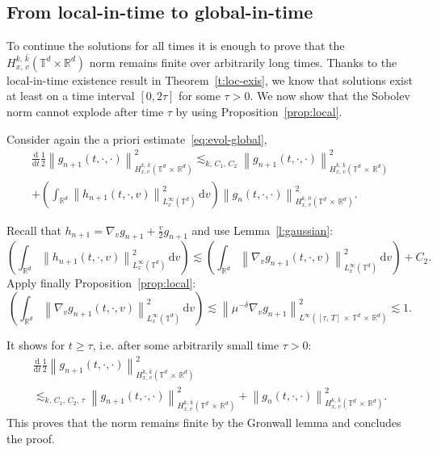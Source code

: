 \documentclass[AHL,Unicode,longabstracts,published]{cedram}
\newcommand{\R}{\mathbb{R}}
\newcommand{\T}{\mathbb{T}}
\newcommand\dt{{\frac{\mathrm d}{\mathrm dt}}}
\newcommand{\dd}{{\, \mathrm d}}
\begin{document}
\subsection{From local-in-time to global-in-time}\label{sec:from-local-time}

To continue the solutions for all times it is enough to prove that the $H^{k,\,\bar k}_{x,\,v}(\T^d \times \R^d)$ norm remains finite over arbitrarily long times. Thanks to the local-in-time existence result in Theorem~\ref{t:loc-exis}, we know that solutions exist at least on a time interval $[0,2 \tau]$ for some $\tau>0$. We now show that the Sobolev norm cannot explode after time $\tau$ by using Proposition~\ref{prop:local}.

Consider again the a priori estimate~\eqref{eq:evol-global},
\begin{multline*}
\dt \frac12 \left\| g_{n+1}(t,\cdot,\cdot) \right\|_{H^{k,\,\bar k}_{x,v}\left(\T^d\,\times\,\R^d\right)}^2  \lesssim_{k,\,C_1,\,C_2} \left\| g_{n+1}(t,\cdot,\cdot)
\right\|_{H^{\bar k,\,\bar k}_{x,\,v}\left(\T^d\,\times\, \R^d\right)}^2 \\
+ \left(\int_{\R^d} \left\| h_{n+1}(t,\cdot,v)
\right\|_{L^\infty_x(\T^d)}^2 \dd v \right)
\left\| g_n(t,\cdot,\cdot) \right\|_{H^{k,\,0}_{x,\,v}\left(\T^d\,\times\,\R^d\right)}^2.
\end{multline*}

Recall that $h_{n+1} = \nabla_v g_{n+1} + \frac{v}{2} g_{n+1}$ and use Lemma~\ref{l:gaussian}:
\[
\left(\int_{\R^d} \left\| h_{n+1}(t,\cdot,v)
\right\|_{L^\infty_x(\T^d)}^2 \dd v \right)
\lesssim \left(\int_{\R^d} \left\| \nabla_v g_{n+1}(t,\cdot,v)
\right\|_{L^\infty_x(\T^d)}^2 \dd v \right) + C_2.
\]
Apply finally Proposition~\ref{prop:local}:
\[
\left(\int_{\R^d} \left\|\nabla_v g_{n+1}(t,\cdot,v) \right\|_{L^\infty_x(\T^d)}^2 \dd v
\right) \lesssim \left\| \mu^{-\delta} \nabla_v g_{n+1} \right\|^2_{L^\infty\left([\tau,\,T]\,\times\,
\T^d\,\times\,\R^d\right)} \lesssim 1.
\]

It shows for $t \ge \tau$, i.e. after some arbitrarily small time $\tau>0$:
\begin{multline*}
\dt \frac12 \left\| g_{n+1}(t,\cdot,\cdot) \right\|_{H^{k,\,\bar k}_{x,\,v}\left(\T^d\,\times\,\R^d\right)}^2\\
\lesssim_{k,\,C_1,\,C_2,\,\tau} \left\| g_{n+1}(t,\cdot,\cdot)
\right\|_{H^{k,\,\bar k}_{x,v}\left(\T^d\,\times\,\R^d\right)}^2 +
\left\| g_n(t,\cdot,\cdot) \right\|_{H^{k,\,\bar k}_{x,\,v}\left(\T^d\,\times\,\R^d\right)}^2.
\end{multline*}
This proves that the norm remains finite by the Gronwall lemma and concludes the proof.



\end{document}
